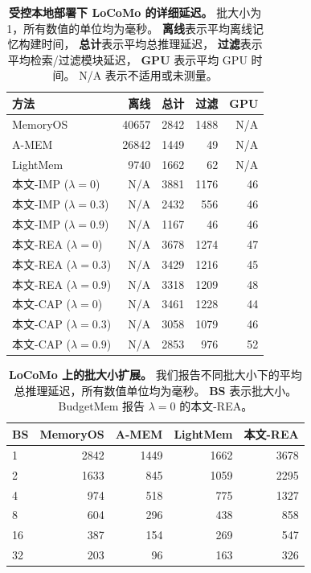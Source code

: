 \begin{table}[h]
    \centering
    \footnotesize
    \caption{\textbf{受控本地部署下 LoCoMo 的详细延迟。}
    批大小为 1，所有数值的单位均为毫秒。
    \textbf{离线}表示平均离线记忆构建时间，
    \textbf{总计}表示平均总推理延迟，
    \textbf{过滤}表示平均检索/过滤模块延迟，
    \textbf{GPU} 表示平均 GPU 时间。
    N/A 表示不适用或未测量。}
    \label{tab:latency_locomo_detail}
    \begin{tabular}{@{}lrrrr@{}}
        \toprule
        \textbf{方法} & \textbf{离线} & \textbf{总计} & \textbf{过滤} & \textbf{GPU} \\
        \midrule
        MemoryOS & 40657 & 2842 & 1488 & N/A \\
        A-MEM    & 26842 & 1449 & 49   & N/A \\
        LightMem & 9740  & 1662 & 62   & N/A \\
        \midrule
        本文-IMP ($\lambda=0$)   & N/A & 3881 & 1176 & 46 \\
        本文-IMP ($\lambda=0.3$) & N/A & 2432 & 556  & 46 \\
        本文-IMP ($\lambda=0.9$) & N/A & 1167 & 46   & 46 \\
        \midrule
        本文-REA ($\lambda=0$)   & N/A & 3678 & 1274 & 47 \\
        本文-REA ($\lambda=0.3$) & N/A & 3429 & 1216 & 45 \\
        本文-REA ($\lambda=0.9$) & N/A & 3318 & 1209 & 48 \\
        \midrule
        本文-CAP ($\lambda=0$)   & N/A & 3461 & 1228 & 44 \\
        本文-CAP ($\lambda=0.3$) & N/A & 3058 & 1079 & 46 \\
        本文-CAP ($\lambda=0.9$) & N/A & 2853 & 976  & 52 \\
        \bottomrule
    \end{tabular}
\end{table}


\begin{table}[h]
    \centering
    \footnotesize
    \caption{\textbf{LoCoMo 上的批大小扩展。}
    我们报告不同批大小下的平均总推理延迟，所有数值单位均为毫秒。
    \textbf{BS} 表示批大小。
    BudgetMem 报告 $\lambda=0$ 的本文-REA。}
    \label{tab:latency_locomo_batch}
    \begin{tabular}{@{}lrrrr@{}}
        \toprule
        \textbf{BS} & \textbf{MemoryOS} & \textbf{A-MEM} & \textbf{LightMem} & \textbf{本文-REA} \\
        \midrule
        1  & 2842 & 1449 & 1662 & 3678 \\
        2  & 1633 & 845  & 1059 & 2295 \\
        4  & 974  & 518  & 775  & 1327 \\
        8  & 604  & 296  & 438  & 858  \\
        16 & 387  & 154  & 269  & 547  \\
        32 & 203  & 96   & 163  & 326  \\
        \bottomrule
    \end{tabular}
\end{table}
